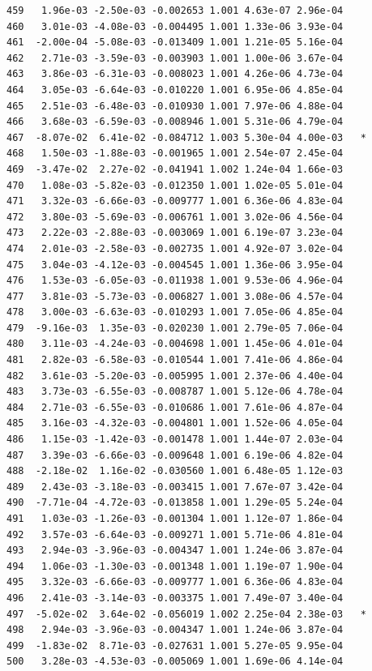 \documentclass[
  letterpaper,
  DIV=11,
  numbers=noendperiod]{scrartcl}
\begin{document}
\begin{verbatim}
459   1.96e-03 -2.50e-03 -0.002653 1.001 4.63e-07 2.96e-04    
460   3.01e-03 -4.08e-03 -0.004495 1.001 1.33e-06 3.93e-04    
461  -2.00e-04 -5.08e-03 -0.013409 1.001 1.21e-05 5.16e-04    
462   2.71e-03 -3.59e-03 -0.003903 1.001 1.00e-06 3.67e-04    
463   3.86e-03 -6.31e-03 -0.008023 1.001 4.26e-06 4.73e-04    
464   3.05e-03 -6.64e-03 -0.010220 1.001 6.95e-06 4.85e-04    
465   2.51e-03 -6.48e-03 -0.010930 1.001 7.97e-06 4.88e-04    
466   3.68e-03 -6.59e-03 -0.008946 1.001 5.31e-06 4.79e-04    
467  -8.07e-02  6.41e-02 -0.084712 1.003 5.30e-04 4.00e-03   *
468   1.50e-03 -1.88e-03 -0.001965 1.001 2.54e-07 2.45e-04    
469  -3.47e-02  2.27e-02 -0.041941 1.002 1.24e-04 1.66e-03    
470   1.08e-03 -5.82e-03 -0.012350 1.001 1.02e-05 5.01e-04    
471   3.32e-03 -6.66e-03 -0.009777 1.001 6.36e-06 4.83e-04    
472   3.80e-03 -5.69e-03 -0.006761 1.001 3.02e-06 4.56e-04    
473   2.22e-03 -2.88e-03 -0.003069 1.001 6.19e-07 3.23e-04    
474   2.01e-03 -2.58e-03 -0.002735 1.001 4.92e-07 3.02e-04    
475   3.04e-03 -4.12e-03 -0.004545 1.001 1.36e-06 3.95e-04    
476   1.53e-03 -6.05e-03 -0.011938 1.001 9.53e-06 4.96e-04    
477   3.81e-03 -5.73e-03 -0.006827 1.001 3.08e-06 4.57e-04    
478   3.00e-03 -6.63e-03 -0.010293 1.001 7.05e-06 4.85e-04    
479  -9.16e-03  1.35e-03 -0.020230 1.001 2.79e-05 7.06e-04    
480   3.11e-03 -4.24e-03 -0.004698 1.001 1.45e-06 4.01e-04    
481   2.82e-03 -6.58e-03 -0.010544 1.001 7.41e-06 4.86e-04    
482   3.61e-03 -5.20e-03 -0.005995 1.001 2.37e-06 4.40e-04    
483   3.73e-03 -6.55e-03 -0.008787 1.001 5.12e-06 4.78e-04    
484   2.71e-03 -6.55e-03 -0.010686 1.001 7.61e-06 4.87e-04    
485   3.16e-03 -4.32e-03 -0.004801 1.001 1.52e-06 4.05e-04    
486   1.15e-03 -1.42e-03 -0.001478 1.001 1.44e-07 2.03e-04    
487   3.39e-03 -6.66e-03 -0.009648 1.001 6.19e-06 4.82e-04    
488  -2.18e-02  1.16e-02 -0.030560 1.001 6.48e-05 1.12e-03    
489   2.43e-03 -3.18e-03 -0.003415 1.001 7.67e-07 3.42e-04    
490  -7.71e-04 -4.72e-03 -0.013858 1.001 1.29e-05 5.24e-04    
491   1.03e-03 -1.26e-03 -0.001304 1.001 1.12e-07 1.86e-04    
492   3.57e-03 -6.64e-03 -0.009271 1.001 5.71e-06 4.81e-04    
493   2.94e-03 -3.96e-03 -0.004347 1.001 1.24e-06 3.87e-04    
494   1.06e-03 -1.30e-03 -0.001348 1.001 1.19e-07 1.90e-04    
495   3.32e-03 -6.66e-03 -0.009777 1.001 6.36e-06 4.83e-04    
496   2.41e-03 -3.14e-03 -0.003375 1.001 7.49e-07 3.40e-04    
497  -5.02e-02  3.64e-02 -0.056019 1.002 2.25e-04 2.38e-03   *
498   2.94e-03 -3.96e-03 -0.004347 1.001 1.24e-06 3.87e-04    
499  -1.83e-02  8.71e-03 -0.027631 1.001 5.27e-05 9.95e-04    
500   3.28e-03 -4.53e-03 -0.005069 1.001 1.69e-06 4.14e-04    

\end{verbatim}
\end{document}
